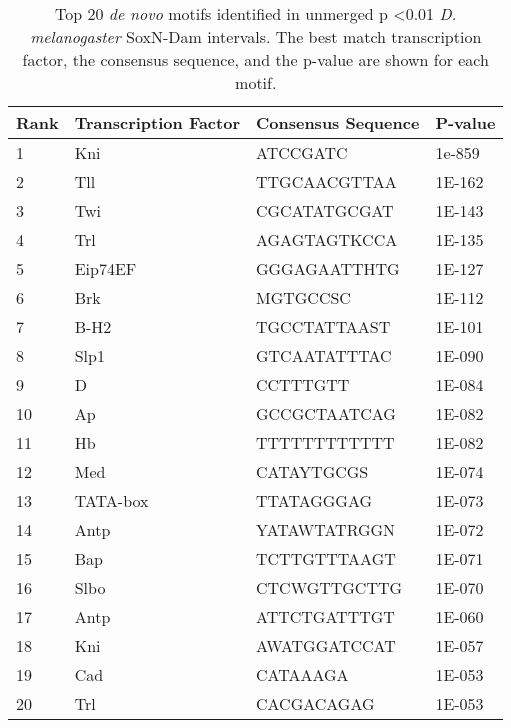\begin{table}[h]
\centering
\begin{tabular}{|l|l|l|l|}
\hline
\textbf{Rank} & \textbf{Transcription Factor} & \textbf{Consensus Sequence} & \textbf{P-value} \\ \hline
1    & Kni                  & ATCCGATC           & 1e-859  \\ \hline
2    & Tll                  & TTGCAACGTTAA       & 1E-162  \\ \hline
3    & Twi                  & CGCATATGCGAT       & 1E-143  \\ \hline
4    & Trl                  & AGAGTAGTKCCA       & 1E-135  \\ \hline
5    & Eip74EF              & GGGAGAATTHTG       & 1E-127  \\ \hline
6    & Brk                  & MGTGCCSC           & 1E-112  \\ \hline
7    & B-H2                 & TGCCTATTAAST       & 1E-101  \\ \hline
8    & Slp1                 & GTCAATATTTAC       & 1E-090  \\ \hline
9    & D                    & CCTTTGTT           & 1E-084  \\ \hline
10   & Ap                   & GCCGCTAATCAG       & 1E-082  \\ \hline
11   & Hb                   & TTTTTTTTTTTT       & 1E-082  \\ \hline
12   & Med                  & CATAYTGCGS         & 1E-074  \\ \hline
13   & TATA-box             & TTATAGGGAG         & 1E-073  \\ \hline
14   & Antp                 & YATAWTATRGGN       & 1E-072  \\ \hline
15   & Bap                  & TCTTGTTTAAGT       & 1E-071  \\ \hline
16   & Slbo                 & CTCWGTTGCTTG       & 1E-070  \\ \hline
17   & Antp                 & ATTCTGATTTGT       & 1E-060  \\ \hline
18   & Kni                  & AWATGGATCCAT       & 1E-057  \\ \hline
19   & Cad                  & CATAAAGA           & 1E-053  \\ \hline
20   & Trl                  & CACGACAGAG         & 1E-053  \\ \hline
\end{tabular}
\caption{Top 20 \emph{de novo} motifs identified in unmerged p \textless 0.01 \emph{D. melanogaster} SoxN-Dam intervals. The best match transcription factor, the consensus sequence, and the p-value are shown for each motif.}
\label{Table 4.7}
\end{table}

